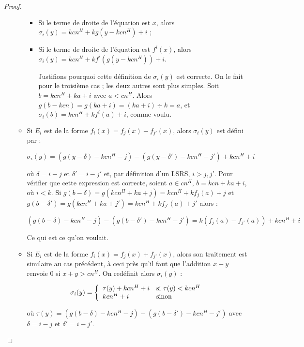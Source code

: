 \documentclass{article}
\begin{document}
\begin{proof}
\begin{enumerate}[itemsep=-1mm,leftmargin=2cm]
\begin{itemize}[itemsep=-1mm, leftmargin=1cm]
\begin{itemize}[itemsep=-1mm,leftmargin=1cm]
								\item %
								Si le terme de droite de l'équation est $x$, alors $\sigma_i(y) = kcn^H + kg\left( y - kcn^H \right) + i$ ;
								
								\item %
								Si le terme de droite de l'équation est $f^i(x)$, alors $\sigma_i(y) = kcn^H + k f^i\left( g\left( y - kcn^H \right) \right) + i$.
								
								Justifions pourquoi cette définition de $\sigma_i(y)$ est correcte. On le fait pour le troisième cas ; les deux autres sont plus simples. Soit $b = kcn^H + ka + i$ avec $a < cn^H$. Alors $g(b-kcn) = g(ka + i) = (ka + i) \div k = a$, et $\sigma_i(b) = kcn^H + kf^i(a) + i$, comme voulu. 
							\end{itemize}
							
			
						\item
							Si $E_i$ est de la forme $f_i(x) = f_j(x) - f_{j'}(x)$, alors $\sigma_i(y)$ est défini par :
							
							\[
								\sigma_i(y) = \left( g(y - \delta) - k cn^H - j \right) - \left( g(y - \delta') - k cn^H - j' \right) + kcn^H + i
							\]
							
							où $\delta = i -j$ et $\delta' = i - j'$ et, par définition d'un LSRS, $i > j, j'$. Pour vérifier que cette expression est correcte, soient $a \in cn^H$, $b = kcn + ka + i$, où $i<k$. Si $g(b - \delta) = g(kcn^H + ka + j) = kcn^H + kf_j(a) + j$ et $g(b - \delta') = g(kcn^H + ka + j') = kcn^H + kf_{j'}(a) + j'$ alors :
							
							\[
								\left( g\left( b - \delta \right) - kcn^H - j \right) - \left( g\left( b - \delta' \right) - kcn^H - j' \right)
								=  k \left( f_{j}(a) - f_{j'}(a) \right) + kcn^H + i
							\]

							
							Ce qui est ce qu'on voulait.
							
						\item
							Si $E_i$ est de la forme $f_i(x) = f_j(x) + f_{j'}(x)$, alors son traitement est similaire au cas précédent, à ceci près qu'il faut que l'addition $x + y$ renvoie $0$ si $x + y > cn^H$. On redéfinit alors $\sigma_i(y)$ : 
							
							\[
								\sigma_i(y) = \left\lbrace \begin{array}{ll} 
									\tau(y) + kcn^H + i & \text{si $\tau(y) < kcn^H$} \\
									kcn^H + i & \text{sinon}
									 \end{array} \right.
							\]
							
							où $\tau(y) = \left( g\left( b - \delta \right) - kcn^H - j \right) - \left( g\left( b - \delta' \right) - kcn^H - j' \right)$ avec $\delta = i - j$ et $\delta' = i - j'$. 
							

\end{itemize}
\end{enumerate}
\end{proof}
\end{document}
